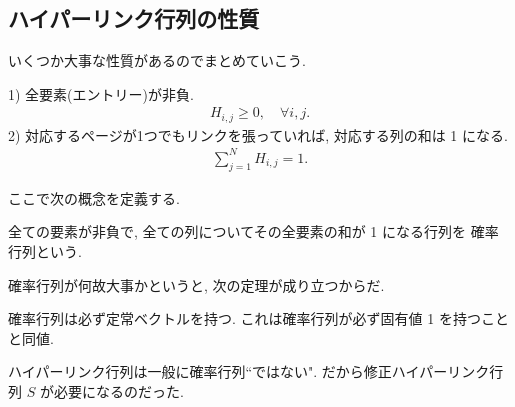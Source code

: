 \documentclass[openany, a4paper, oneside]{jsbook}
\begin{document}
\subsection{ハイパーリンク行列の性質}

いくつか大事な性質があるのでまとめていこう.
\begin{prop}
1) 全要素(エントリー)が非負.
   \begin{align}
    H_{i,j}
    \geqslant
    0, \quad \forall i,j.
   \end{align}
2) 対応するページが1つでもリンクを張っていれば, 対応する列の和は 1 になる.
   \begin{align}
    \sum_{j=1}^{N}    H_{i,j}
    = 1.
   \end{align}
\end{prop}
ここで次の概念を定義する.
\begin{defn}\label{linear-algebra-google-pagerank14}
全ての要素が非負で, 全ての列についてその全要素の和が 1 になる行列を
確率行列という.
\end{defn}
確率行列が何故大事かというと, 次の定理が成り立つからだ.
\begin{thm}\label{linear-algebra-google-pagerank15}
確率行列は必ず定常ベクトルを持つ.
これは確率行列が必ず固有値 1 を持つことと同値.
\end{thm}
ハイパーリンク行列は一般に確率行列``ではない".
だから修正ハイパーリンク行列 $S$ が必要になるのだった.
\end{document}
